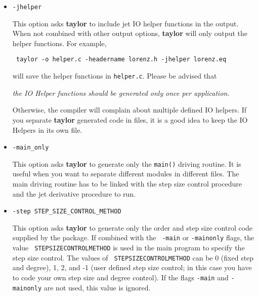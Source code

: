 \documentclass[10pt]{article}
\theoremstyle{remark}
\newcommand{\taylorname}{{\bf taylor}}
\begin{document}
\begin{itemize}
{{The code needs a header file (defining the macros for the arithmetic)
in order to be compiled into object code. The default header filename
is {\tt taylor.h}.  The header filename can be changed using
{\verb+-headername NAME+} (see below).  You can also use the
{\verb+-header+} option to include the necessary macros in the output
file.}
}
\item {
{\verb+-jhelper+

This option asks \taylorname{} to include jet IO helper functions in
the output.  When not combined with other output options,
\taylorname{} will only output the helper functions. For example,

\verb+ taylor -o helper.c -headername lorenz.h -jhelper lorenz.eq+

will save the helper functions in \verb+helper.c+. Please be advised
that
\begin{center} 
{\em the IO Helper functions should be generated only once per
  application.}
\end{center} 
Otherwise, the compiler will complain about multiple defined IO
helpers.  If you separate \taylorname{} generated code in files, it is
a good idea to keep the IO Helpers in its own file.  }
}
\item {

{\verb+-main_only+

This option asks \taylorname{} to generate only the \verb+main()+
driving routine. It is useful when you want to separate different
modules in different files. The main driving routine has to be linked
with the step size control procedure and the jet derivative procedure
to run.  }
}
\item {
{\verb+-step STEP_SIZE_CONTROL_METHOD+

This option asks \taylorname{} to generate only the order and step
size control code supplied by the package. If combined with the {\tt
  -main} or {\tt -mainonly} flags, the value {\tt
  STEPSIZECONTROLMETHOD} is used in
the main program to specify the step size control. The values of {\tt
  STEPSIZECONTROLMETHOD} can be 0
(fixed step and degree), 1, 2, and -1 (user defined step size control;
in this case you have to code your own step size and degree
control). If the flags {\tt -main} and {\tt -mainonly} are
not used, this value is ignored.

}}
\end{itemize}
\end{document}
